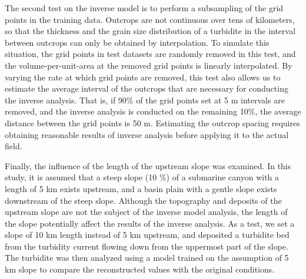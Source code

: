 The second test on the inverse model is to perform a subsampling of the grid points in the training data. Outcrops are not continuous over tens of kilometers, so that the thickness and the grain size distribution of a turbidite in the interval between outcrops can only be obtained by interpolation. To simulate this situation, the grid points in test datasets are randomly removed in this test, and the volume-per-unit-area at the removed grid points is linearly interpolated. By varying the rate at which grid points are removed, this test also allows us to estimate the average interval of the outcrops that are necessary for conducting the inverse analysis. That is, if 90\% of the grid points set at 5 m intervals are removed, and the inverse analysis is conducted on the remaining 10\%, the average distance between the grid points is 50 m. Estimating the outcrop spacing requires obtaining reasonable results of inverse analysis before applying it to the actual field.

Finally, the influence of the length of the upstream slope was examined. In this study, it is assumed that a steep slope (10 \%) of a submarine canyon with a length of 5 km exists upstream, and a basin plain with a gentle slope exists downstream of the steep slope. Although the topography and deposits of the upstream slope are not the subject of the inverse model analysis, the length of the slope potentially affect the results of the inverse analysis. As a test, we set a slope of 10 km length instead of 5 km upstream, and deposited a turbidite bed from the turbidity current flowing down from the uppermost part of the slope. The turbidite was then analyzed using a model trained on the assumption of 5 km slope to compare the reconstructed values with the original conditions.